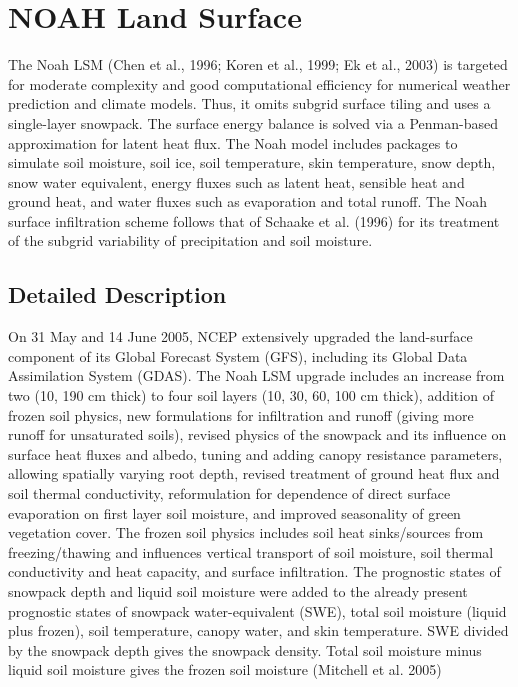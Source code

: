 \hypertarget{group___n_o_a_h}{}\section{N\+O\+AH Land Surface}
\label{group___n_o_a_h}


The Noah L\+SM (Chen et al., 1996; Koren et al., 1999; Ek et al., 2003) is targeted for moderate complexity and good computational efficiency for numerical weather prediction and climate models. Thus, it omits subgrid surface tiling and uses a single-\/layer snowpack. The surface energy balance is solved via a Penman-\/based approximation for latent heat flux. The Noah model includes packages to simulate soil moisture, soil ice, soil temperature, skin temperature, snow depth, snow water equivalent, energy fluxes such as latent heat, sensible heat and ground heat, and water fluxes such as evaporation and total runoff. The Noah surface infiltration scheme follows that of Schaake et al. (1996) for its treatment of the subgrid variability of precipitation and soil moisture.  




\subsection{Detailed Description}
On 31 May and 14 June 2005, N\+C\+EP extensively upgraded the land-\/surface component of its Global Forecast System (G\+FS), including its Global Data Assimilation System (G\+D\+AS). The Noah L\+SM upgrade includes an increase from two (10, 190 cm thick) to four soil layers (10, 30, 60, 100 cm thick), addition of frozen soil physics, new formulations for infiltration and runoff (giving more runoff for unsaturated soils), revised physics of the snowpack and its influence on surface heat fluxes and albedo, tuning and adding canopy resistance parameters, allowing spatially varying root depth, revised treatment of ground heat flux and soil thermal conductivity, reformulation for dependence of direct surface evaporation on first layer soil moisture, and improved seasonality of green vegetation cover. The frozen soil physics includes soil heat sinks/sources from freezing/thawing and influences vertical transport of soil moisture, soil thermal conductivity and heat capacity, and surface infiltration. The prognostic states of snowpack depth and liquid soil moisture were added to the already present prognostic states of snowpack water-\/equivalent (S\+WE), total soil moisture (liquid plus frozen), soil temperature, canopy water, and skin temperature. S\+WE divided by the snowpack depth gives the snowpack density. Total soil moisture minus liquid soil moisture gives the frozen soil moisture (Mitchell et al. 2005)

